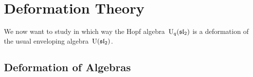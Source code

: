 \documentclass[a4paper, 11pt, oneside]{scrartcl}
\begin{document}
%
%
%





\section{Deformation Theory}

We now want to study in which way the Hopf algebra~$\operatorname{U}_q(\mathfrak{sl}_2)$ is a deformation of the usual enveloping algebra~$\operatorname{U}(\mathfrak{sl}_2)$.



\subsection{Deformation of Algebras}
\end{document}
